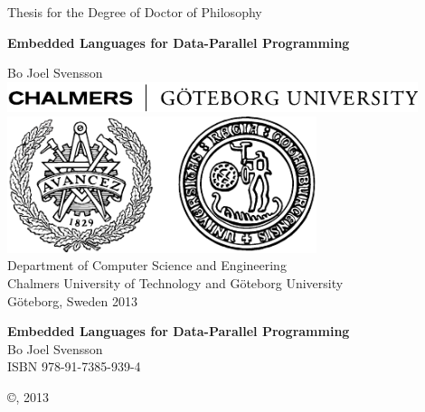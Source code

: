 \documentclass[a4paper]{book}
\newcommand{\thesistitle}{Embedded Languages for Data-Parallel Programming}
\newcommand{\dept}{Department of Computer Science and Engineering}
\newcommand{\uni}{Chalmers University of Technology and G\"oteborg University}
\begin{document}
\begin{titlepage}
\begin{centering}
{\sc Thesis for the Degree of Doctor of Philosophy}
\vspace{30ex}

{\LARGE\bf\thesistitle}

\vspace{7ex}

\large Bo Joel Svensson
\vfill
\includegraphics[width=120mm]{./img/ChalmGUtextsvEng}\\[5mm]
\includegraphics[height=4cm]{./img/ChalmGUmarke}\\

\vspace{1cm}
\normalsize
{\sc \dept}\\
{\sc \uni}\\
G\"oteborg, Sweden 2013

\end{centering}
\end{titlepage}


\quad \vfill

{\noindent\large\bf\thesistitle} \\
\noindent Bo Joel Svensson \\
\noindent ISBN 978-91-7385-939-4 \\

\vspace{1cm}

\noindent\copyright {}, 2013 \\ 
\vspace{1cm} 
\end{document}
